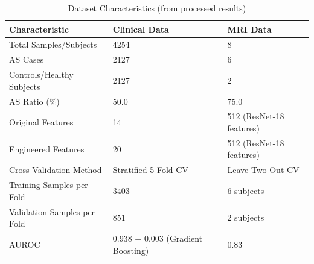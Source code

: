 \begin{table}[htbp]
\centering
\caption{Dataset Characteristics (from processed results)}
\label{tab:dataset_characteristics_processed}
\begin{tabular}{@{}lll@{}}
\toprule
\textbf{Characteristic} & \textbf{Clinical Data} & \textbf{MRI Data} \\ \midrule
Total Samples/Subjects & 4254 & 8 \\
AS Cases & 2127 & 6 \\
Controls/Healthy Subjects & 2127 & 2 \\
AS Ratio (\%) & 50.0 & 75.0 \\
Original Features & 14 & 512 (ResNet-18 features) \\
Engineered Features & 20 & 512 (ResNet-18 features) \\
Cross-Validation Method & Stratified 5-Fold CV & Leave-Two-Out CV \\
Training Samples per Fold & 3403 & 6 subjects \\
Validation Samples per Fold & 851 & 2 subjects \\
AUROC & 0.938 $\pm$ 0.003 (Gradient Boosting) & 0.83 \\
\bottomrule
\end{tabular}
\end{table}

